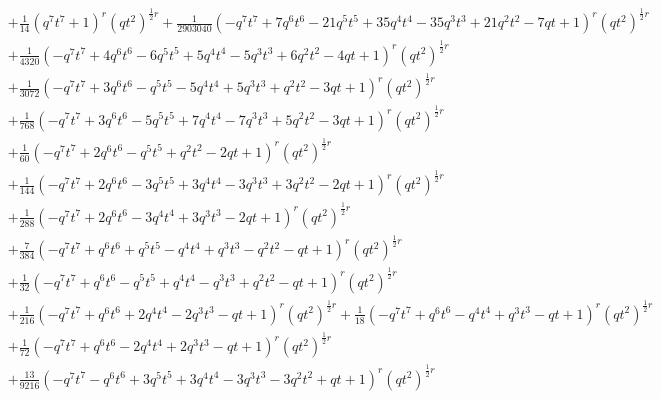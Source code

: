 \documentclass[11pt,english]{amsart}
\numberwithin{equation}{section}
\numberwithin{figure}{section}
\theoremstyle{plain}
\theoremstyle{plain}
\theoremstyle{definition}
\theoremstyle{remark}
\begin{document}
{\begin{align*}
& + \frac{1}{14}  {\left(q^{7} t^{7} + 1\right)}^{r} \left(q t^{2}\right)^{\frac{1}{2}  r} + \frac{1}{2903040}  {\left(-q^{7} t^{7} + 7  q^{6} t^{6} - 21  q^{5} t^{5} + 35  q^{4} t^{4} - 35  q^{3} t^{3} + 21  q^{2} t^{2} - 7  q t + 1\right)}^{r} \left(q t^{2}\right)^{\frac{1}{2}  r} \\
& + \frac{1}{4320}  {\left(-q^{7} t^{7} + 4  q^{6} t^{6} - 6  q^{5} t^{5} + 5  q^{4} t^{4} - 5  q^{3} t^{3} + 6  q^{2} t^{2} - 4  q t + 1\right)}^{r} \left(q t^{2}\right)^{\frac{1}{2}  r} \\
& + \frac{1}{3072}  {\left(-q^{7} t^{7} + 3  q^{6} t^{6} - q^{5} t^{5} - 5  q^{4} t^{4} + 5  q^{3} t^{3} + q^{2} t^{2} - 3  q t + 1\right)}^{r} \left(q t^{2}\right)^{\frac{1}{2}  r} \\
& + \frac{1}{768}  {\left(-q^{7} t^{7} + 3  q^{6} t^{6} - 5  q^{5} t^{5} + 7  q^{4} t^{4} - 7  q^{3} t^{3} + 5  q^{2} t^{2} - 3  q t + 1\right)}^{r} \left(q t^{2}\right)^{\frac{1}{2}  r} \\
& + \frac{1}{60}  {\left(-q^{7} t^{7} + 2  q^{6} t^{6} - q^{5} t^{5} + q^{2} t^{2} - 2  q t + 1\right)}^{r} \left(q t^{2}\right)^{\frac{1}{2}  r} \\
& + \frac{1}{144}  {\left(-q^{7} t^{7} + 2  q^{6} t^{6} - 3  q^{5} t^{5} + 3  q^{4} t^{4} - 3  q^{3} t^{3} + 3  q^{2} t^{2} - 2  q t + 1\right)}^{r} \left(q t^{2}\right)^{\frac{1}{2}  r} \\
& + \frac{1}{288}  {\left(-q^{7} t^{7} + 2  q^{6} t^{6} - 3  q^{4} t^{4} + 3  q^{3} t^{3} - 2  q t + 1\right)}^{r} \left(q t^{2}\right)^{\frac{1}{2}  r} \\
& + \frac{7}{384}  {\left(-q^{7} t^{7} + q^{6} t^{6} + q^{5} t^{5} - q^{4} t^{4} + q^{3} t^{3} - q^{2} t^{2} - q t + 1\right)}^{r} \left(q t^{2}\right)^{\frac{1}{2}  r} \\
& + \frac{1}{32}  {\left(-q^{7} t^{7} + q^{6} t^{6} - q^{5} t^{5} + q^{4} t^{4} - q^{3} t^{3} + q^{2} t^{2} - q t + 1\right)}^{r} \left(q t^{2}\right)^{\frac{1}{2}  r} \\
& + \frac{1}{216}  {\left(-q^{7} t^{7} + q^{6} t^{6} + 2  q^{4} t^{4} - 2  q^{3} t^{3} - q t + 1\right)}^{r} \left(q t^{2}\right)^{\frac{1}{2}  r} + \frac{1}{18}  {\left(-q^{7} t^{7} + q^{6} t^{6} - q^{4} t^{4} + q^{3} t^{3} - q t + 1\right)}^{r} \left(q t^{2}\right)^{\frac{1}{2}  r} \\
& + \frac{1}{72}  {\left(-q^{7} t^{7} + q^{6} t^{6} - 2  q^{4} t^{4} + 2  q^{3} t^{3} - q t + 1\right)}^{r} \left(q t^{2}\right)^{\frac{1}{2}  r} \\
& + \frac{13}{9216}  {\left(-q^{7} t^{7} - q^{6} t^{6} + 3  q^{5} t^{5} + 3  q^{4} t^{4} - 3  q^{3} t^{3} - 3  q^{2} t^{2} + q t + 1\right)}^{r} \left(q t^{2}\right)^{\frac{1}{2}  r} \\

\end{align*}}
\end{document}
